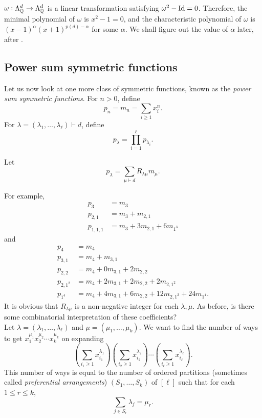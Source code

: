 	\begin{remark}
		$\omega : \Lambda_{\mathbb{Q}}^d \to \Lambda_{\mathbb{Q}}^d$ is a linear transformation satisfying $\omega^2 - \operatorname{Id} = 0$. Therefore, the minimal polynomial of $\omega$ is $x^2 - 1 = 0$, and the characteristic polynomial of $\omega$ is $(x-1)^\alpha (x+1)^{p(d) - \alpha}$ for some $\alpha$. We shall figure out the value of $\alpha$ later, after .
	\end{remark}


\subsection{Power sum symmetric functions}

	Let us now look at one more class of symmetric functions, known as the \emph{power sum symmetric functions}. For $n > 0$, define
	\[ p_n = m_n = \sum_{i \ge 1} x_i^n. \]
	For $\lambda = (\lambda_1,\ldots,\lambda_\ell) \vdash d$, define
	\[ p_\lambda = \prod_{i=1}^\ell p_{\lambda_i}. \]

	Let
	\[ p_\lambda = \sum_{\mu \vdash d} R_{\lambda\mu} m_\mu. \]

	For example,
	\begin{align*}
		p_3 &= m_3 \\
		p_{2,1} &= m_3 + m_{2,1} \\
		p_{1,1,1} &= m_3 + 3m_{2,1} + 6m_{1^3}
	\end{align*}
	and
	\begin{align*}
		p_4 &= m_4 \\
		p_{3,1} &= m_4 + m_{3,1} \\
		p_{2,2} &= m_4 + 0m_{3,1} + 2m_{2,2} \\
		p_{2,1^2} &= m_4 + 2m_{3,1} + 2m_{2,2} + 2m_{2,1^2} \\
		p_{1^4} &= m_4 + 4m_{3,1} + 6m_{2,2} + 12m_{2,1^2} + 24m_{1^4}.
	\end{align*}
	It is obvious that $R_{\lambda\mu}$ is a non-negative integer for each $\lambda,\mu$. As before, is there some combinatorial interpretation of these coefficients?\\
	Let $\lambda = (\lambda_1,\ldots,\lambda_\ell)$ and $\mu = (\mu_1,\ldots,\mu_k)$. We want to find the number of ways to get $x_1^{\mu_1} x_2^{\mu_2} \cdots x_k^{\mu_k}$ on expanding
	\[ \left( \sum_{i_1 \ge 1} x_{i_1}^{\lambda_1} \right) \left( \sum_{i_2 \ge 1} x_{i_2}^{\lambda_2} \right) \cdots \left( \sum_{i_\ell \ge 1} x_{i_\ell}^{\lambda_\ell} \right). \]
	This number of ways is equal to the number of ordered partitions (sometimes called \emph{preferential arrangements}) $(S_1,\ldots,S_k)$ of $[\ell]$ such that for each $1 \le r \le k$,
	\[ \sum_{j \in S_r} \lambda_j = \mu_r.  \]

